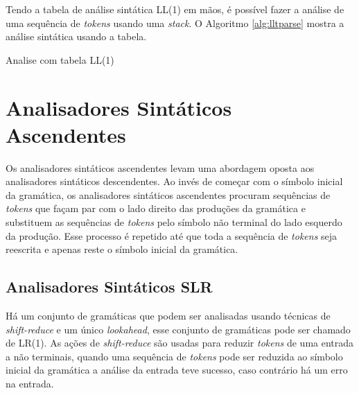 Tendo a tabela de análise sintática LL(1) em mãos, é possível fazer a análise de uma sequência de \textit{tokens} usando uma \textit{stack}. O Algoritmo \ref{alg:lltparse} mostra a análise sintática usando a tabela. 

\begin{algorithm}[htp]
\caption{Analise com tabela LL(1)}\label{alg:lltparse}
\end{algorithm}
{}

\section{Analisadores Sintáticos Ascendentes}
Os analisadores sintáticos ascendentes levam uma abordagem oposta aos analisadores sintáticos descendentes. Ao invés de começar com o símbolo inicial da gramática, os analisadores sintáticos ascendentes procuram sequências de \textit{tokens} que façam par com o lado direito das produções da gramática e substituem as sequências de \textit{tokens} pelo símbolo não terminal do lado esquerdo da produção. Esse processo é repetido até que toda a sequência de \textit{tokens} seja reescrita e apenas reste o símbolo inicial da gramática.

\subsection{Analisadores Sintáticos SLR}

Há um conjunto de gramáticas que podem ser analisadas usando técnicas de \textit{shift-reduce} e um único \textit{lookahead}, esse conjunto de gramáticas pode ser chamado de LR(1). As ações de \textit{shift-reduce} são usadas para reduzir \textit{tokens} de uma entrada a não terminais, quando uma sequência de \textit{tokens} pode ser reduzida ao símbolo inicial da gramática a análise da entrada teve sucesso, caso contrário há um erro na entrada.


